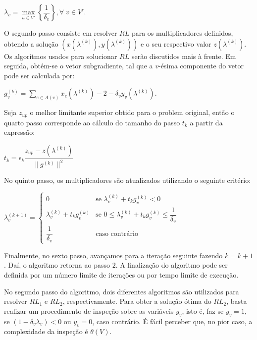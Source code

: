 \documentclass[12pt, a4paper]{article}
\theoremstyle{plain}
\theoremstyle{definition}
\theoremstyle{remark}
\begin{document}
\begin{center}
	$\lambda_v = \max\limits_{u \in V'} \left\{\dfrac{1}{\delta_v}\right\}, \forall \; v \in V'$.
\end{center}

O segundo passo consiste em resolver $RL$ para os multiplicadores definidos, obtendo a solução $(x(\lambda^{(k)}), y(\lambda^{(k)}))$ e o seu respectivo valor $z(\lambda^{(k)})$. Os algoritmos usados para solucionar $RL$ serão discutidos mais à frente. Em seguida, obtém-se o vetor subgradiente, tal que a $v$-ésima componente do vetor pode ser calculada por:

\begin{center}
	$g_v^{(k)} = \displaystyle\sum_{e \in A(v)} x_e (\lambda^{(k)}) - 2 - \delta_v y_v(\lambda^{(k)})$.
\end{center}

Seja $z_{up}$ o melhor limitante superior obtido para o problem original, então o quarto passo corresponde ao cálculo do tamanho do passo $t_k$ a partir da expressão:

\begin{center}
	$t_k = \epsilon_k \dfrac{z_{up} - z(\lambda^{(k)})}{\lVert g^{(k)}\rVert^2}$
\end{center}

No quinto passo, os multiplicadores são atualizados utilizando o seguinte critério:

\begin{center}
	$\lambda_v^{(k+1)} =
	\begin{cases}
	0 & \text{se } \lambda_v^{(k)} + t_k g_v^{(k)} < 0 \\
	\lambda_v^{(k)} + t_k g_v^{(k)} & \text{se } 0 \leq \lambda_v^{(k)} + t_k g_v^{(k)} \leq \dfrac{1}{\delta_v}\\
	\dfrac{1}{\delta_v} & \text{caso contrário}
	\end{cases}$
\end{center}

Finalmente, no sexto passo, avançamos para a iteração seguinte fazendo $k = k + 1$. Daí, o algoritmo retorna ao passo $2$. A finalização do algoritmo pode ser definida por um número limite de iterações ou por tempo limite de execução.

No segundo passo do algoritmo, dois diferentes algoritmos são utilizados para resolver $RL_1$ e $RL_2$, respectivamente. Para obter a solução ótima do $RL_2$, basta realizar um procedimento de inspeção sobre as variáveis $y_v$, isto é, faz-se $y_v = 1$, se $(1 - \delta_v \lambda_v) < 0$ ou $y_v = 0$, caso contrário. É fácil perceber que, no pior caso, a complexidade da inspeção é $\theta(V)$.
\end{document}
